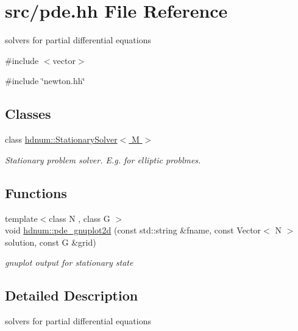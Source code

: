 \hypertarget{pde_8hh}{
\section{src/pde.hh File Reference}
\label{pde_8hh}
}


solvers for partial differential equations  


{\ttfamily \#include $<$vector$>$}\par
{\ttfamily \#include \char`\"{}newton.hh\char`\"{}}\par
\subsection*{Classes}
\begin{DoxyCompactItemize}
\item 
class \hyperlink{classhdnum_1_1StationarySolver}{hdnum::StationarySolver$<$ M $>$}
\begin{DoxyCompactList}\small\item\em Stationary problem solver. E.g. for elliptic problmes. \item\end{DoxyCompactList}\end{DoxyCompactItemize}
\subsection*{Functions}
\begin{DoxyCompactItemize}
\item 
\hypertarget{namespacehdnum_afd142b0c5879f417216714867930501d}{
{\footnotesize template$<$class N , class G $>$ }\\void \hyperlink{namespacehdnum_afd142b0c5879f417216714867930501d}{hdnum::pde\_\-gnuplot2d} (const std::string \&fname, const Vector$<$ N $>$ solution, const G \&grid)}
\label{namespacehdnum_afd142b0c5879f417216714867930501d}

\begin{DoxyCompactList}\small\item\em gnuplot output for stationary state \item\end{DoxyCompactList}\end{DoxyCompactItemize}


\subsection{Detailed Description}
solvers for partial differential equations 